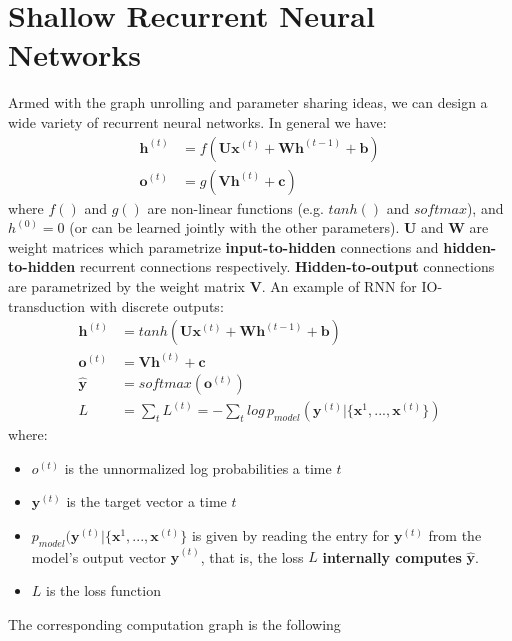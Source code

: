 \section{Shallow Recurrent Neural Networks}
Armed with the graph unrolling and parameter sharing ideas, we can design a wide variety of recurrent neural networks. In general we have:
\[\begin{split}
    \textbf{h}^{(t)} & = f(\textbf{U}\textbf{x}^{(t)} + \textbf{W}\textbf{h}^{(t-1)} + \textbf{b})\\
    \textbf{o}^{(t)} & = g(\textbf{V}\textbf{h}^{(t)} + \textbf{c})
\end{split}\]
where $f()$ and $g()$ are non-linear functions (e.g. $tanh()$ and $softmax$), and $h^{(0)} = 0$ (or can be learned jointly with the other parameters). $\textbf{U}$ and $\textbf{W}$ are weight matrices which parametrize \textbf{input-to-hidden} connections and \textbf{hidden-to-hidden} recurrent connections respectively. \textbf{Hidden-to-output} connections are parametrized by the weight matrix $\textbf{V}$.\newline\newline
An example of RNN for IO-transduction with discrete outputs:
\[\begin{split}
    \textbf{h}^{(t)} & = tanh(\textbf{U}\textbf{x}^{(t)} + \textbf{W}\textbf{h}^{(t-1)} + \textbf{b})\\
    \textbf{o}^{(t)} & = \textbf{V}\textbf{h}^{(t)} + \textbf{c}\\
    \hat{\textbf{y}} & = softmax(\textbf{o}^{(t)})\\
    L & = \sum_t L^{(t)} = - \sum_t log\,p_{model}(\textbf{y}^{(t)} | \{\textbf{x}^{1}, ..., \textbf{x}^{(t)}\})
\end{split}\]
where:
\begin{itemize}
    \item $o^{(t)}$ is the unnormalized log probabilities a time $t$
    \item $\textbf{y}^{(t)}$ is the target vector a time $t$
    \item $p_{model}(\textbf{y}^{(t)} | \{\textbf{x}^{1}, ..., \textbf{x}^{(t)}\}$ is given by reading the entry for $\textbf{y}^{(t)}$ from the model’s output vector $\hat{\textbf{y}}^{(t)}$, that is, the loss $L$ \textbf{internally computes} $\hat{\textbf{y}}$.
    \item $L$ is the loss function
\end{itemize}
The corresponding computation graph is the following
